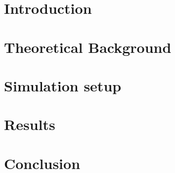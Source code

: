 \documentclass[a4paper,10pt,twoside,ngerman,bibliography=totoc]{scrreprt}
\begin{document}
	\mathswapoff                 %

	\graphicspath{{pics/}{pics/logos/}{pics/diagrams/}{pics/plots/}}
	\pagestyle{empty}
	
	\cleardoublepage
	\cleardoublepage
	
	\cleardoublepage
	
	\pagestyle{plain}
	\vspace*{-2cm} 
	\tableofcontents
	\cleardoublepage
	
	
	\cleardoublepage
	\pagestyle{scrheadings}
	\chapter{Introduction}
	
	\chapter{Theoretical Background}
	
	
	
	
	\chapter{Simulation setup}
	
	
	\chapter{Results}
	
	
	
	
	\chapter{Conclusion}
	
	\clearpage
	\renewcommand{\bibname}{Bibliography}
	\printbibliography
	\cleardoublepage
	\appendix
	
	
\end{document}
